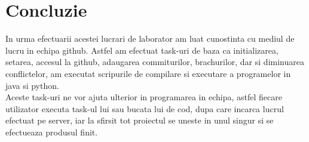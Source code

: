 \section{Concluzie}
In urma efectuarii acestei lucrari de laborator am luat cunostinta cu mediul de lucru in echipa github. Astfel am efectuat task-uri de baza ca initializarea, setarea, accesul la github, adaugarea commiturilor, brachurilor, dar si diminuarea conflictelor, am executat scripurile de compilare si executare a programelor in java si python.\\
Aceste task-uri ne vor ajuta ulterior in programarea in echipa, astfel fiecare utilizator executa task-ul lui sau bucata lui de cod, dupa care incarca lucrul efectuat pe server, iar la sfirsit tot proiectul se uneste in unul singur si se efectueaza produsul finit.